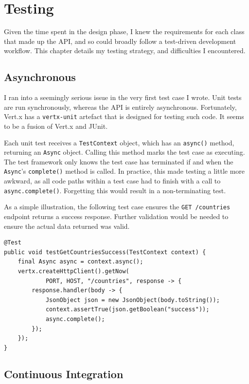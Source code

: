 \documentclass[12pt,a4paper]{bhamdissertation}
\newcommand{\code}[1]{\texttt{#1}}
\begin{document}
\chapter{Testing} \label{testing}

Given the time spent in the design phase, I knew the requirements for each class that made up the API, and so could broadly follow a test-driven development workflow. This chapter details my testing strategy, and difficulties I encountered.

\section{Asynchronous}

I ran into a seemingly serious issue in the very first test case I wrote. Unit tests are run synchronously, whereas the API is entirely asynchronous. Fortunately, Vert.x has a \code{vertx-unit} artefact that is designed for testing such code. It seems to be a fusion of Vert.x and JUnit.

Each unit test receives a \code{TestContext} object, which has an \code{async()} method, returning an \code{Async} object. Calling this method marks the test case as executing. The test framework only knows the test case has terminated if and when the \code{Async}'s \code{complete()} method is called. In practice, this made testing a little more awkward, as all code paths within a test case had to finish with a call to \code{async.complete()}. Forgetting this would result in a non-terminating test.

As a simple illustration, the following test case ensures the \code{GET /countries} endpoint returns a success response. Further validation would be needed to ensure the actual data returned was valid.

\begin{verbatim}
@Test
public void testGetCountriesSuccess(TestContext context) {
    final Async async = context.async();
    vertx.createHttpClient().getNow(
            PORT, HOST, "/countries", response -> {
        response.handler(body -> {
            JsonObject json = new JsonObject(body.toString());
            context.assertTrue(json.getBoolean("success"));
            async.complete();
        });
    });
}
\end{verbatim}

\section{Continuous Integration}
\end{document}
